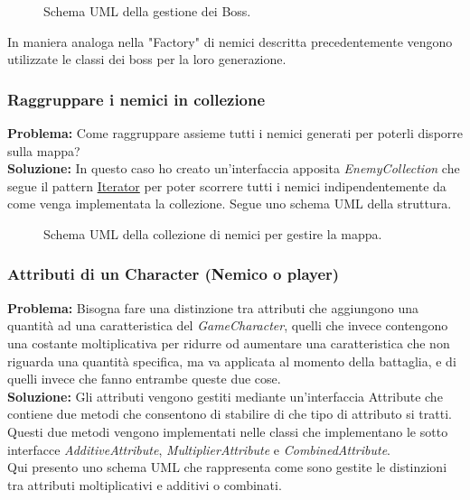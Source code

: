 \documentclass[a4paper,12pt]{report}
\begin{document}
\begin{figure}[H]
	\centering
	
	\caption{Schema UML della gestione dei Boss.}
	\label{fig:Schema UML della gestione dei boss.}
\end{figure}

In maniera analoga nella "Factory" di nemici descritta precedentemente vengono utilizzate le classi dei boss per la loro generazione.

\subsubsection{Raggruppare i nemici in collezione}
\textbf{Problema:} Come raggruppare assieme tutti i nemici generati per poterli disporre sulla mappa?\\
\textbf{Soluzione:} In questo caso ho creato un'interfaccia apposita \textit{EnemyCollection} che segue il pattern \href{https://refactoring.guru/design-patterns/iterator}{Iterator} per poter scorrere tutti i nemici indipendentemente da come venga implementata la collezione. Segue uno schema UML della struttura.\\

\begin{figure}[H]
	\centering
	
	\caption{Schema UML della collezione di nemici per gestire la mappa.}
	\label{fig:Schema UML della collezione di nemici per gestire la mappa.}
\end{figure}

\subsubsection{Attributi di un Character (Nemico o player)}
\textbf{Problema:} Bisogna fare una distinzione tra attributi che aggiungono una quantità ad una caratteristica del \textit{GameCharacter}, quelli che invece contengono una costante moltiplicativa per ridurre od aumentare una caratteristica che non riguarda una quantità specifica, ma va applicata al momento della battaglia, e di quelli invece che fanno entrambe queste due cose.\\
\textbf{Soluzione:} Gli attributi vengono gestiti mediante un'interfaccia Attribute che contiene due metodi che consentono di stabilire di che tipo di attributo si tratti. Questi due metodi vengono implementati nelle classi che implementano le sotto interfacce \textit{AdditiveAttribute}, \textit{MultiplierAttribute} e \textit{CombinedAttribute}.\\
Qui presento uno schema UML che rappresenta come sono gestite le distinzioni tra attributi moltiplicativi e additivi o combinati.\\
\end{document}

